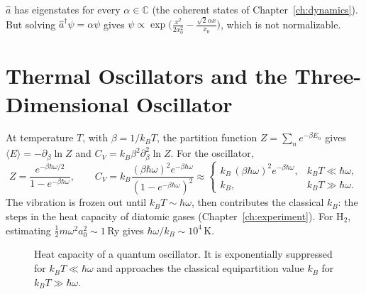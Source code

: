 \begin{fact}
$\hat{a}$ has eigenstates for every $\alpha\in\mathbb{C}$ (the coherent states of Chapter~\ref{ch:dynamics}). But solving $\hat{a}^\dagger\psi = \alpha\psi$ gives $\psi\propto\exp\bigl(\frac{x^2}{2x_0^2} - \frac{\sqrt2\alpha x}{x_0}\bigr)$, which is not normalizable.
\end{fact}

\section{Thermal Oscillators and the Three-Dimensional Oscillator}

At temperature $T$, with $\beta = 1/k_BT$, the partition function $Z = \sum_ne^{-\beta E_n}$ gives $\langle E\rangle = -\partial_\beta\ln Z$ and $C_V = k_B\beta^2\partial_\beta^2\ln Z$. For the oscillator,
\[
    Z = \frac{e^{-\beta\hbar\omega/2}}{1-e^{-\beta\hbar\omega}},
    \qquad
    C_V = k_B\frac{(\beta\hbar\omega)^2e^{-\beta\hbar\omega}}{(1-e^{-\beta\hbar\omega})^2}
    \approx\begin{cases}k_B\,(\beta\hbar\omega)^2e^{-\beta\hbar\omega}, & k_BT\ll\hbar\omega,\\ k_B, & k_BT\gg\hbar\omega.\end{cases}
\]
The vibration is frozen out until $k_BT\sim\hbar\omega$, then contributes the classical $k_B$: the steps in the heat capacity of diatomic gases (Chapter~\ref{ch:experiment}). For H$_2$, estimating $\frac12m\omega^2a_0^2\sim1$\,Ry gives $\hbar\omega/k_B\sim10^4$\,K.

\begin{figure}[ht]
\centering
{}
\caption{Heat capacity of a quantum oscillator. It is exponentially suppressed for $k_BT\ll\hbar\omega$ and approaches the classical equipartition value $k_B$ for $k_BT\gg\hbar\omega$.}
\end{figure}

